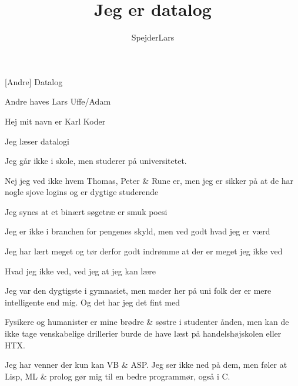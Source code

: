 \documentclass[a4paper,12pt]{article}
\title{Jeg er datalog}
\author{SpejderLars}
\begin{document}
\maketitle

\begin{sketch}

\begin{roles}
  [Andre] Datalog
\end{roles}

\begin{props}
   Andre
   haves
   Lars
   Uffe/Adam
\end{props}


 Hej mit navn er Karl Koder

 Jeg læser datalogi

 Jeg går ikke i skole, men studerer på universitetet.

 Nej jeg ved ikke hvem Thomas, Peter \& Rune er, men jeg er sikker på at de har 
nogle sjove logins og er dygtige studerende

 Jeg synes at et binært søgetræ er smuk poesi

 Jeg er ikke i branchen for pengenes skyld, men ved godt hvad jeg er værd

 Jeg har lært meget og tør derfor godt indrømme at der er meget jeg ikke ved

 Hvad jeg ikke ved, ved jeg at jeg kan lære

 Jeg var den dygtigste i gymnasiet, men møder her på uni folk der er mere 
intelligente end mig. Og det har jeg det fint med

 Fysikere og humanister er mine brødre \& søstre i studenter ånden, men kan de 
ikke tage venskabelige drillerier burde de have læst på handelshøjskolen eller 
HTX.

 Jeg har venner der kun kan VB \& ASP.
Jeg ser ikke ned på dem, men føler at Lisp, ML \& prolog gør mig til en bedre 
programmør, også i C.


\end{sketch}
\end{document}
